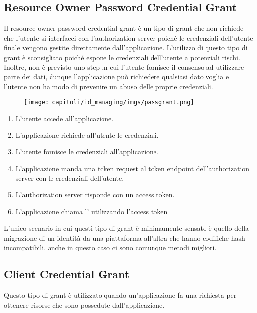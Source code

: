 \subsection{Resource Owner Password Credential Grant}

Il resource owner password credential grant è un tipo di grant che non richiede che
l'utente si interfacci con l'authorization server poiché le credenziali dell'utente
finale vengono gestite direttamente dall'applicazione. L'utilizzo di questo
tipo di grant è sconsigliato poiché espone le credenziali dell'utente a potenziali rischi.
Inoltre, non è previsto uno step in cui l'utente fornisce il consenso ad utilizzare parte
dei dati, dunque l'applicazione può richiedere qualsiasi dato voglia e l'utente non ha
modo di prevenire un abuso delle proprie credenziali.

\begin{figure}[H]
      \centering
      \texttt{[image: capitoli/id\_managing/imgs/passgrant.png]}
\end{figure}

\begin{enumerate}
      \item L'utente accede all'applicazione.
      \item L'applicazione richiede all'utente le credenziali.
      \item L'utente fornisce le credenziali all'applicazione.
      \item L'applicazione manda una token request al token endpoint dell'authorization
            server con le credenziali dell'utente.
      \item L'authorization server risponde con un access token.
      \item L'applicazione chiama l'\api{} utilizzando l'access token
\end{enumerate}

L'unico scenario in cui questi tipo di grant è minimamente sensato è quello della
migrazione di un identità da una piattaforma all'altra che hanno codifiche hash
incompatibili, anche in questo caso ci sono comunque metodi migliori.

\subsection{Client Credential Grant}

Questo tipo di grant è utilizzato quando un'applicazione fa una richiesta \api{} per
ottenere risorse che sono possedute dall'applicazione.

